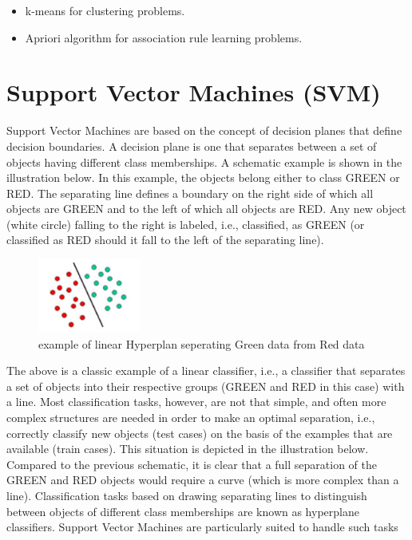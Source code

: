\begin{itemize}
  \item k-means for clustering problems.
  \item Apriori algorithm for association rule learning problems.
\end{itemize}

\par



\section{Support Vector Machines (SVM) }\label{sec:svm}

Support Vector Machines are based on the concept of decision planes that define decision boundaries. A decision plane is one that separates between a set of objects having different class memberships. A schematic example is shown in the illustration below. In this example, the objects belong either to class GREEN or RED. The separating line defines a boundary on the right side of which all objects are GREEN and to the left of which all objects are RED. Any new object (white circle) falling to the right is labeled, i.e., classified, as GREEN (or classified as RED should it fall to the left of the separating line).


\begin{figure}[H]
\centering
\includegraphics[width=0.3\textwidth]{img/svm1.png}
\caption{example of linear Hyperplan seperating Green data from Red data }
\label{122 }
\end{figure}


The above is a classic example of a linear classifier, i.e., a classifier that separates a set of objects into their respective groups (GREEN and RED in this case) with a line. Most classification tasks, however, are not that simple, and often more complex structures are needed in order to make an optimal separation, i.e., correctly classify new objects (test cases) on the basis of the examples that are available (train cases). This situation is depicted in the illustration below. Compared to the previous schematic, it is clear that a full separation of the GREEN and RED objects would require a curve (which is more complex than a line). Classification tasks based on drawing separating lines to distinguish between objects of different class memberships are known as hyperplane classifiers. Support Vector Machines are particularly suited to handle such tasks


